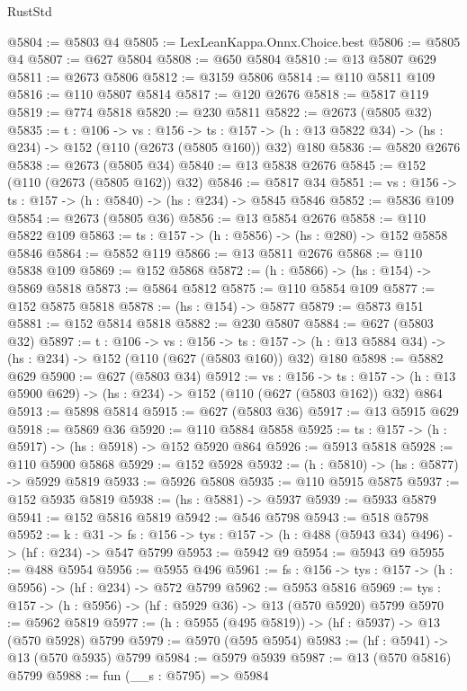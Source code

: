\begin{lexlean}{RustStd}
\begin{coremodule}
@5804 := @5803 @4
@5805 := LexLeanKappa.Onnx.Choice.best
@5806 := @5805 @4
@5807 := @627 @5804
@5808 := @650 @5804
@5810 := @13 @5807 @629
@5811 := @2673 @5806
@5812 := @3159 @5806
@5814 := @110 @5811 @109
@5816 := @110 @5807 @5814
@5817 := @120 @2676
@5818 := @5817 @119
@5819 := @774 @5818
@5820 := @230 @5811
@5822 := @2673 (@5805 @32)
@5835 := {t : @106} ->
  {vs : @156} ->
  {ts : @157} -> (h : @13 @5822 @34) -> (hs : @234) -> @152 (@110 (@2673 (@5805 @160)) @32) @180
@5836 := @5820 @2676
@5838 := @2673 (@5805 @34)
@5840 := @13 @5838 @2676
@5845 := @152 (@110 (@2673 (@5805 @162)) @32)
@5846 := @5817 @34
@5851 := {vs : @156} -> {ts : @157} -> (h : @5840) -> (hs : @234) -> @5845 @5846
@5852 := @5836 @109
@5854 := @2673 (@5805 @36)
@5856 := @13 @5854 @2676
@5858 := @110 @5822 @109
@5863 := {ts : @157} -> (h : @5856) -> (hs : @280) -> @152 @5858 @5846
@5864 := @5852 @119
@5866 := @13 @5811 @2676
@5868 := @110 @5838 @109
@5869 := @152 @5868
@5872 := (h : @5866) -> (hs : @154) -> @5869 @5818
@5873 := @5864 @5812
@5875 := @110 @5854 @109
@5877 := @152 @5875 @5818
@5878 := (hs : @154) -> @5877
@5879 := @5873 @151
@5881 := @152 @5814 @5818
@5882 := @230 @5807
@5884 := @627 (@5803 @32)
@5897 := {t : @106} ->
  {vs : @156} ->
  {ts : @157} -> (h : @13 @5884 @34) -> (hs : @234) -> @152 (@110 (@627 (@5803 @160)) @32) @180
@5898 := @5882 @629
@5900 := @627 (@5803 @34)
@5912 := {vs : @156} ->
  {ts : @157} -> (h : @13 @5900 @629) -> (hs : @234) -> @152 (@110 (@627 (@5803 @162)) @32) @864
@5913 := @5898 @5814
@5915 := @627 (@5803 @36)
@5917 := @13 @5915 @629
@5918 := @5869 @36
@5920 := @110 @5884 @5858
@5925 := {ts : @157} -> (h : @5917) -> (hs : @5918) -> @152 @5920 @864
@5926 := @5913 @5818
@5928 := @110 @5900 @5868
@5929 := @152 @5928
@5932 := (h : @5810) -> (hs : @5877) -> @5929 @5819
@5933 := @5926 @5808
@5935 := @110 @5915 @5875
@5937 := @152 @5935 @5819
@5938 := (hs : @5881) -> @5937
@5939 := @5933 @5879
@5941 := @152 @5816 @5819
@5942 := @546 @5798
@5943 := @518 @5798
@5952 := {k : @31} ->
  {fs : @156} -> {tys : @157} -> (h : @488 (@5943 @34) @496) -> (hf : @234) -> @547 @5799
@5953 := @5942 @9
@5954 := @5943 @9
@5955 := @488 @5954
@5956 := @5955 @496
@5961 := {fs : @156} -> {tys : @157} -> (h : @5956) -> (hf : @234) -> @572 @5799
@5962 := @5953 @5816
@5969 := {tys : @157} -> (h : @5956) -> (hf : @5929 @36) -> @13 (@570 @5920) @5799
@5970 := @5962 @5819
@5977 := (h : @5955 (@495 @5819)) -> (hf : @5937) -> @13 (@570 @5928) @5799
@5979 := @5970 (@595 @5954)
@5983 := (hf : @5941) -> @13 (@570 @5935) @5799
@5984 := @5979 @5939
@5987 := @13 (@570 @5816) @5799
@5988 := fun (__s : @5795) => @5984

\end{coremodule}
\end{lexlean}
